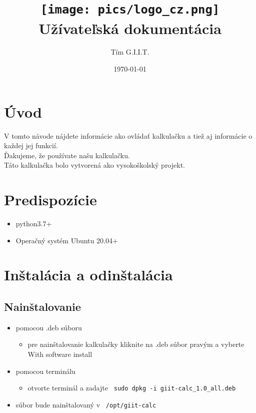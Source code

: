 \documentclass[a4paper, 11pt]{article}
\title{\texttt{[image: pics/logo\_cz.png]}\\Užívateľská dokumentácia}
\author{Tím G.I.I.T.}
\date{\today}
\begin{document}
	\maketitle
	\newpage
	
    \section{Úvod}
    V tomto návode nájdete informácie ako ovládať kalkulačku a tiež aj informácie o každej jej funkcií.\\
    Ďakujeme, že používate našu kalkulačku. \\
    Táto kalkulačka bolo vytvorená ako vysokoškolský projekt. 
    \section{Predispozície}
    \begin{itemize}
        \item python3.7+
        \item Operačný systém Ubuntu 20.04+
    \end{itemize}
    \section{Inštalácia a odinštalácia}
    \subsection{Nainštalovanie}
    \begin{itemize}
        \item pomocou .deb súboru
        \begin{itemize}
            \item pre nainštalovanie kalkulačky kliknite na .deb súbor pravým a vyberte With software install
        \end{itemize}
        \item pomocou terminálu
        \begin{itemize}
            \item otvorte terminál a zadajte \texttt{ sudo dpkg -i giit-calc\_1.0\_all.deb }
        \end{itemize}
        \item súbor bude nainštalovaný v \texttt{ /opt/giit-calc }
    \end{itemize}
\end{document}
